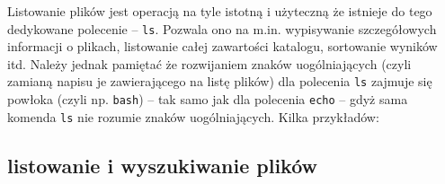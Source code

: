 Listowanie plików jest operacją na tyle istotną i użyteczną że istnieje do tego dedykowane polecenie – \Verb$ls$. Pozwala ono na m.in. wypisywanie szczegółowych informacji o plikach, listowanie całej zawartości katalogu, sortowanie wyników itd.
Należy jednak pamiętać że rozwijaniem znaków uogólniających (czyli zamianą napisu je zawierającego na listę plików) dla polecenia \Verb$ls$ zajmuje się powłoka (czyli np. \Verb$bash$) – tak samo jak dla polecenia \Verb$echo$ – gdyż sama komenda \Verb$ls$ nie rozumie znaków uogólniających.
%
Kilka przykładów:

\subsection{listowanie i  wyszukiwanie plików}

